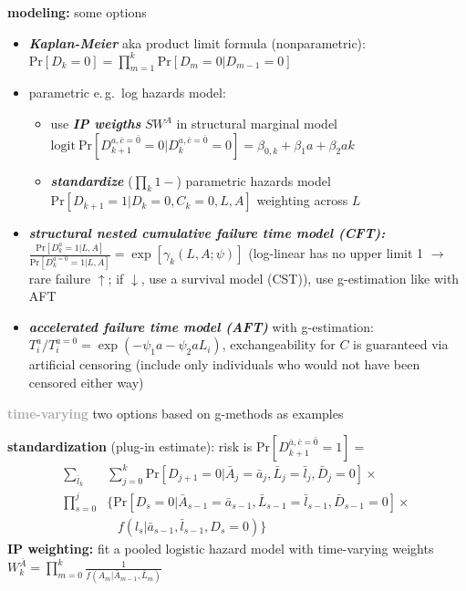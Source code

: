 \documentclass[8pt,twoside]{extarticle}
\begin{document}
\begin{multicols}{2}
 \textbf{modeling:} some options
\begin{itemize}[itemsep=0em, topsep=0pt, partopsep=0pt,parsep=0pt, leftmargin=1.5em]
\setlength{\itemsep}{0pt}%
\setlength{\parskip}{0pt}
\item \textit{\textbf{Kaplan-Meier}} aka product limit formula (nonparametric): $\mathrm{Pr}\left[D_k=0\right] = \prod_{m=1}^k \mathrm{Pr}\left[D_m=0|D_{m-1}=0\right]$
\item parametric e.\,g.\ log hazards model: 
\begin{itemize}[itemsep=0em, topsep=0pt, partopsep=0pt,parsep=0pt, leftmargin=1.5em]
\setlength{\itemsep}{0pt}%
\setlength{\parskip}{0pt}
\item use \textit{\textbf{IP weigths}} $SW^A$ in structural marginal model $\mathrm{logit} \: \mathrm{Pr}\left[D_{k+1}^{a, \bar{c}=\bar{0}}=0|D_{k}^{a, \bar{c}=\bar{0}}=0\right] = \beta_{0,k} + \beta_1a+\beta_2ak $
\item \textit{\textbf{standardize}} ($\prod_k 1-$) parametric hazards model $\mathrm{Pr}\left[D_{k+1}=1|D_k = 0, C_k=0, L, A\right]$ weighting across $L$
\end{itemize}
\item \textit{\textbf{structural nested cumulative failure time model (CFT):}}
$\frac{\mathrm{Pr}\left[D_k^a=1|L,A\right]}{\mathrm{Pr}\left[D_k^{a=0}=1|L,A\right]} = \exp\left[\gamma_k(L,A;\psi)\right]$ (log-linear has no upper limit 1 $\rightarrow$ rare failure $\uparrow$; if $\downarrow$, use a survival model (CST)), use g-estimation like with AFT
\item \textit{\textbf{accelerated failure time model (AFT)}} with g-estimation: $T_i^a/T_i^{a=0} = \exp(-\psi_1a -\psi_2aL_i)$, exchangeability for $C$ is guaranteed via artificial censoring (include only individuals who would not have been censored either way) 
\end{itemize}



\vspace{0.2em}
 \colorbox{lightgray!20!white}{\begin{minipage}{28em}




\textbf{\textcolor{darkgray}{time-varying}} two options based on g-methods as examples

 \textbf{standardization} (plug-in estimate): risk is $\mathrm{Pr}\left[D_{k+1}^{\bar{a},\bar{c}=\bar{0}}=1\right] =$ \vspace{-0.5em}
\begin{align*}%
 \sum_{\bar{l}_k}&\sum_{j=0}^k \mathrm{Pr}\left[D_{j+1}=0|\bar{A}_j=\bar{a}_j, \bar{L}_j=\bar{l}_j, \bar{D}_j=0\right] \times \\[-0.1em]
\prod_{s=0}^j & \Big\{  \mathrm{Pr}\left[D_s=0|\bar{A}_{s-1}=\bar{a}_{s-1}, \bar{L}_{s-1}=\bar{l}_{s-1}, \bar{D}_{s-1}=0\right] \times  \\[-0.7em]
   &   \,\,\,\,\, f\left(l_s|\bar{a}_{s-1}, \bar{l}_{s-1}, D_s=0\right)\Big\}
\end{align*}
 \textbf{IP weighting:} fit a pooled logistic hazard model with time-varying weights
$W^{\bar{A}}_k =\prod_{m=0}^k\frac{1}{f(A_m|\bar{A}_{m-1}, \bar{L}_m)}$




\end{minipage}}
\end{multicols}
\end{document}
